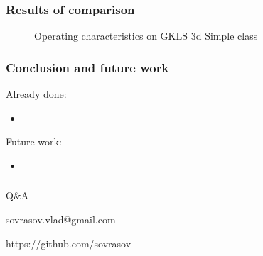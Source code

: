 \documentclass[aspectratio=1610]{beamer}
\begin{document}
\begin{frame}
  \frametitle{Results of comparison}
  \begin{figure}[ht]
    \hspace*{-0.9cm}
    \caption{Operating characteristics on GKLS 3d Simple class}
  \end{figure}
\end{frame}


\begin{frame}
  \frametitle{Conclusion and future work}
    Already done:
    \begin{itemize}
      \item
    \end{itemize}
    Future work:
    \begin{itemize}
      \item
    \end{itemize}
\end{frame}

\begin{frame}{{}}
  \frametitle{ }
  \begin{center}
    \Large{Q\&A}

\vspace{1cm}

    sovrasov.vlad@gmail.com

    https://github.com/sovrasov
  \end{center}
\end{frame}
\end{document}
